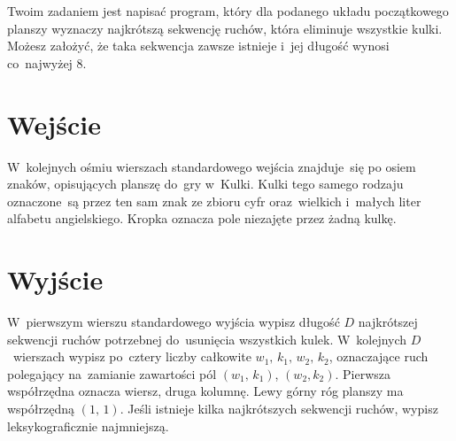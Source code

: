 \documentclass{spiral-kurs}
\begin{document}
	Twoim zadaniem jest napisać program, który dla podanego układu początkowego planszy wyznaczy najkrótszą sekwencję ruchów, która eliminuje wszystkie kulki. Możesz założyć, że taka sekwencja zawsze istnieje i~jej długość wynosi co~najwyżej 8.

	\section{Wejście}
	W~kolejnych ośmiu wierszach standardowego wejścia znajduje~się po osiem znaków, opisujących planszę do~gry w~Kulki. Kulki tego samego rodzaju oznaczone~są przez ten sam znak ze zbioru cyfr oraz~wielkich i~małych liter alfabetu angielskiego. Kropka oznacza pole niezajęte przez żadną kulkę.

	\section{Wyjście}
	W~pierwszym wierszu standardowego wyjścia wypisz długość $D$ najkrótszej sekwencji ruchów potrzebnej do~usunięcia wszystkich kulek. W~kolejnych $D$~wierszach wypisz po~cztery liczby całkowite $w_1, \, k_1, \, w_2, \, k_2$, oznaczające ruch polegający na~zamianie zawartości pól $(w_1, \, k_1)$, $(w_2, k_2)$. Pierwsza współrzędna oznacza wiersz, druga kolumnę. Lewy górny róg planszy ma współrzędną $(1, \, 1)$.
	Jeśli istnieje kilka najkrótszych sekwencji ruchów, wypisz leksykograficznie najmniejszą.

	\vspace{-4pt}
\end{document}
